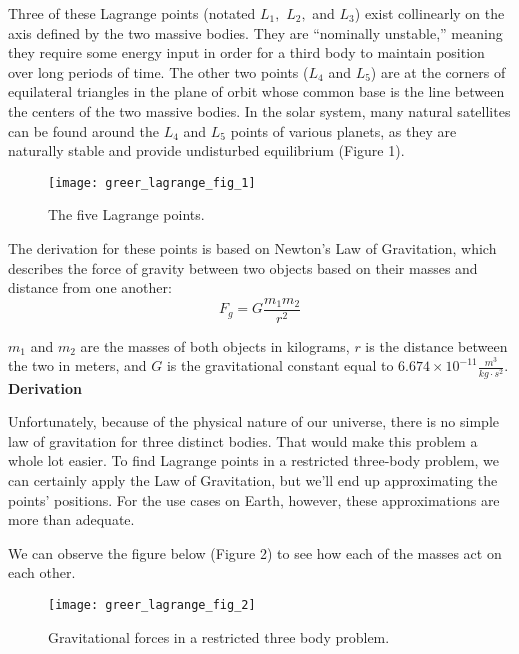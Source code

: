 Three of these Lagrange points (notated $L_1,$ $L_2,$ and $L_3$) exist collinearly on the axis defined by the two massive bodies. They are “nominally unstable,” meaning they require some energy input in order for a third body to maintain position over long periods of time. The other two points ($L_4$ and $L_5$) are at the corners of equilateral triangles in the plane of orbit whose common base is the line between the centers of the two massive bodies. In the solar system, many natural satellites can be found around the $L_4$ and $L_5$ points of various planets, as they are naturally stable and provide undisturbed equilibrium (Figure 1). 

\begin{figure}[h]
  \begin{center}
    \texttt{[image: greer\_lagrange\_fig\_1]}
  \end{center}
  \caption{The five Lagrange points.}
  \label{fig:1}
\end{figure}

The derivation for these points is based on Newton’s Law of Gravitation, which describes the force of gravity between two objects based on their masses and distance from one another: \[F_g = G\frac{m_1m_2}{r^2}\]

$m_1$ and $m_2$ are the masses of both objects in kilograms, $r$ is the distance between the two in meters, and $G$ is the gravitational constant equal to $6.674\times{10^{-11}} \frac{m^3}{kg\cdot{}s^2}$.
\newline\newline
\textbf{Derivation}

Unfortunately, because of the physical nature of our universe, there is no simple law of gravitation for three distinct bodies. That would make this problem a whole lot easier. To find Lagrange points in a restricted three-body problem, we can certainly apply the Law of Gravitation, but we’ll end up approximating the points’ positions. For the use cases on Earth, however, these approximations are more than adequate. 

We can observe the figure below (Figure 2) to see how each of the masses act on each other. 

\begin{figure}[h]
  \begin{center}
    \texttt{[image: greer\_lagrange\_fig\_2]}
  \end{center}
  \caption{Gravitational forces in a restricted three body problem.}
  \label{fig:2}
\end{figure}


